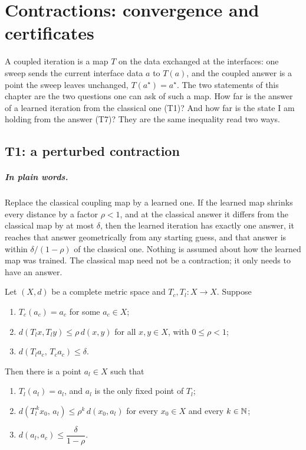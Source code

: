 \chapter{Contractions: convergence and certificates}

A coupled iteration is a map $T$ on the data exchanged at the interfaces: one
sweep sends the current interface data $a$ to $T(a)$, and the coupled answer is
a point the sweep leaves unchanged, $T(a^\star)=a^\star$.  The two statements of
this chapter are the two questions one can ask of such a map.  How far is the
answer of a learned iteration from the classical one (T1)?  And how far is the
state I am holding from the answer (T7)?  They are the same inequality read two
ways.

\section{T1: a perturbed contraction}

\paragraph{In plain words.}
Replace the classical coupling map by a learned one.  If the learned map shrinks
every distance by a factor $\rho<1$, and at the classical answer it differs from
the classical map by at most $\delta$, then the learned iteration has exactly
one answer, it reaches that answer geometrically from any starting guess, and
that answer is within $\delta/(1-\rho)$ of the classical one.  Nothing is
assumed about how the learned map was trained.  The classical map need not be a
contraction; it only needs to have an answer.

\begin{theorem}\label{thm:T1}
  \leanok
  Let $(X,d)$ be a complete metric space and $T_c,T_l:X\to X$.  Suppose
  \begin{enumerate}
    \item $T_c(a_c)=a_c$ for some $a_c\in X$;
    \item $d(T_l x,T_l y)\le\rho\,d(x,y)$ for all $x,y\in X$, with $0\le\rho<1$;
    \item $d(T_l a_c,\,T_c a_c)\le\delta$.
  \end{enumerate}
  Then there is a point $a_l\in X$ such that
  \begin{enumerate}
    \item $T_l(a_l)=a_l$, and $a_l$ is the only fixed point of $T_l$;
    \item $d(T_l^{\,k}x_0,\,a_l)\le\rho^{k}\,d(x_0,a_l)$ for every $x_0\in X$ and every $k\in\mathbb{N}$;
    \item $d(a_l,a_c)\le\dfrac{\delta}{1-\rho}$.
  \end{enumerate}
\end{theorem}

